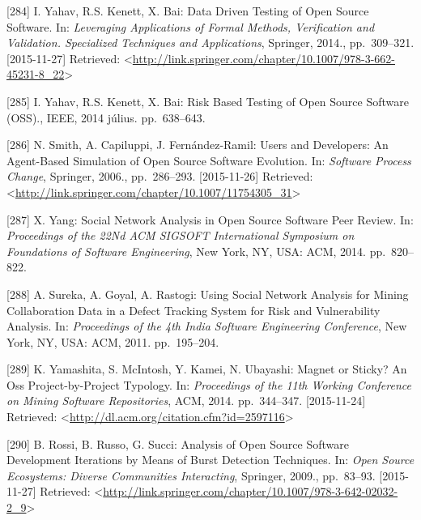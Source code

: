 \documentclass[12pt,magyar,a4paper,oneside]{scrreprt}
\begin{document}
\leavevmode\hypertarget{ref-yahav_data_2014}{}%
{[}284{]} I. Yahav, R.S. Kenett, X. Bai: Data Driven Testing of Open
Source Software. In: \emph{Leveraging Applications of Formal Methods,
Verification and Validation. Specialized Techniques and Applications},
Springer, 2014., pp.~309--321. {[}2015-11-27{]} Retrieved:
\textless{}\url{http://link.springer.com/chapter/10.1007/978-3-662-45231-8_22}\textgreater{}

\leavevmode\hypertarget{ref-yahav_risk_2014}{}%
{[}285{]} I. Yahav, R.S. Kenett, X. Bai: Risk Based Testing of Open
Source Software (OSS)., IEEE, 2014 július. pp.~638--643.

\leavevmode\hypertarget{ref-smith_users_2006}{}%
{[}286{]} N. Smith, A. Capiluppi, J. Fernández-Ramil: Users and
Developers: An Agent-Based Simulation of Open Source Software Evolution.
In: \emph{Software Process Change}, Springer, 2006., pp.~286--293.
{[}2015-11-26{]} Retrieved:
\textless{}\url{http://link.springer.com/chapter/10.1007/11754305_31}\textgreater{}

\leavevmode\hypertarget{ref-yang_social_2014}{}%
{[}287{]} X. Yang: Social Network Analysis in Open Source Software Peer
Review. In: \emph{Proceedings of the 22Nd ACM SIGSOFT International
Symposium on Foundations of Software Engineering}, New York, NY, USA:
ACM, 2014. pp.~820--822.

\leavevmode\hypertarget{ref-sureka_using_2011}{}%
{[}288{]} A. Sureka, A. Goyal, A. Rastogi: Using Social Network Analysis
for Mining Collaboration Data in a Defect Tracking System for Risk and
Vulnerability Analysis. In: \emph{Proceedings of the 4th India Software
Engineering Conference}, New York, NY, USA: ACM, 2011. pp.~195--204.

\leavevmode\hypertarget{ref-yamashita_magnet_2014}{}%
{[}289{]} K. Yamashita, S. McIntosh, Y. Kamei, N. Ubayashi: Magnet or
Sticky? An Oss Project-by-Project Typology. In: \emph{Proceedings of the
11th Working Conference on Mining Software Repositories}, ACM, 2014.
pp.~344--347. {[}2015-11-24{]} Retrieved:
\textless{}\url{http://dl.acm.org/citation.cfm?id=2597116}\textgreater{}

\leavevmode\hypertarget{ref-rossi_analysis_2009}{}%
{[}290{]} B. Rossi, B. Russo, G. Succi: Analysis of Open Source Software
Development Iterations by Means of Burst Detection Techniques. In:
\emph{Open Source Ecosystems: Diverse Communities Interacting},
Springer, 2009., pp.~83--93. {[}2015-11-27{]} Retrieved:
\textless{}\url{http://link.springer.com/chapter/10.1007/978-3-642-02032-2_9}\textgreater{}
\end{document}

